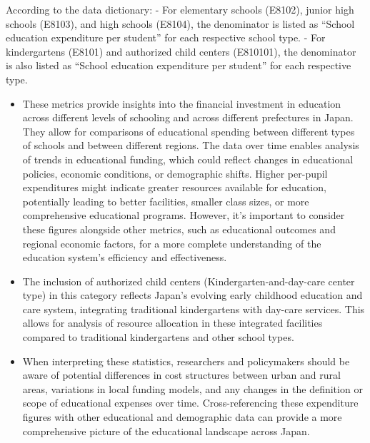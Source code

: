 \documentclass[
  12pt,
  letterpaper,
  DIV=11,
  numbers=noendperiod]{scrartcl}
\begin{document}
According to the data dictionary: - For elementary schools (E8102),
junior high schools (E8103), and high schools (E8104), the denominator
is listed as ``School education expenditure per student'' for each
respective school type. - For kindergartens (E8101) and authorized child
centers (E810101), the denominator is also listed as ``School education
expenditure per student'' for each respective type.

\begin{itemize}
\item
  These metrics provide insights into the financial investment in
  education across different levels of schooling and across different
  prefectures in Japan. They allow for comparisons of educational
  spending between different types of schools and between different
  regions. The data over time enables analysis of trends in educational
  funding, which could reflect changes in educational policies, economic
  conditions, or demographic shifts. Higher per-pupil expenditures might
  indicate greater resources available for education, potentially
  leading to better facilities, smaller class sizes, or more
  comprehensive educational programs. However, it's important to
  consider these figures alongside other metrics, such as educational
  outcomes and regional economic factors, for a more complete
  understanding of the education system's efficiency and effectiveness.
\item
  The inclusion of authorized child centers (Kindergarten-and-day-care
  center type) in this category reflects Japan's evolving early
  childhood education and care system, integrating traditional
  kindergartens with day-care services. This allows for analysis of
  resource allocation in these integrated facilities compared to
  traditional kindergartens and other school types.
\item
  When interpreting these statistics, researchers and policymakers
  should be aware of potential differences in cost structures between
  urban and rural areas, variations in local funding models, and any
  changes in the definition or scope of educational expenses over time.
  Cross-referencing these expenditure figures with other educational and
  demographic data can provide a more comprehensive picture of the
  educational landscape across Japan.
\end{itemize}
\end{document}

